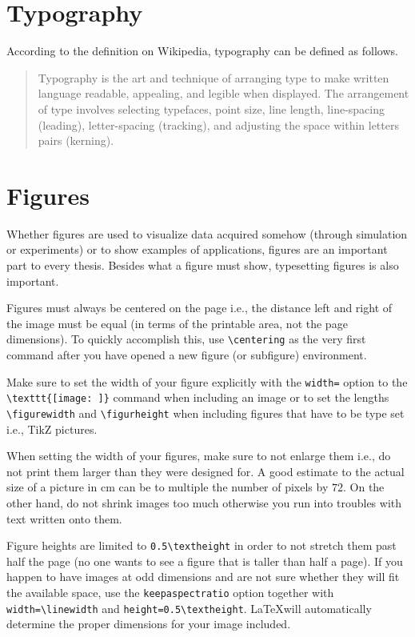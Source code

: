 \section{Typography}\label{sec:style-guide:typography}

According to the definition on Wikipedia, typography can be defined as follows.%

\begin{quotation}
Typography is the art and technique of arranging type to make written language readable, appealing, and legible when displayed. The arrangement of type involves selecting typefaces, point size, line length, line-spacing (leading), letter-spacing (tracking), and adjusting the space within letters pairs (kerning).
\end{quotation}


\section{Figures}\label{sec:style-guide:figures}

Whether figures are used to visualize data acquired somehow (through simulation or experiments) or to show examples of applications, figures are an important part to every thesis.
Besides what a figure must show, typesetting figures is also important.

Figures must always be centered on the page i.e., the distance left and right of the image must be equal (in terms of the printable area, not the page dimensions).
To quickly accomplish this, use \lstinline!\centering! as the very first command after you have opened a new figure (or subfigure) environment.

Make sure to set the width of your figure explicitly with the \lstinline!width=! option to the \lstinline!\texttt{[image: ]}! command when including an image or to set the lengths \lstinline!\figurewidth! and \lstinline!\figurheight! when including figures that have to be type set i.e., TikZ pictures.

When setting the width of your figures, make sure to not enlarge them i.e., do not print them larger than they were designed for.
A good estimate to the actual size of a picture in $\si{\cm}$ can be to multiple the number of pixels by $72$.
On the other hand, do not shrink images too much otherwise you run into troubles with text written onto them.

Figure heights are limited to \lstinline!0.5\textheight! in order to not stretch them past half the page (no one wants to see a figure that is taller than half a page).
If you happen to have images at odd dimensions and are not sure whether they will fit the available space, use the \lstinline!keepaspectratio! option together with \lstinline!width=\linewidth! and \lstinline!height=0.5\textheight!.
\LaTeX will automatically determine the proper dimensions for your image included.


